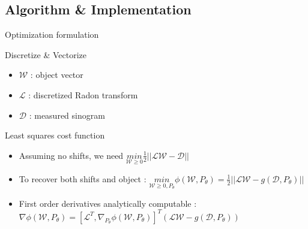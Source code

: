 \documentclass{beamer}
\begin{document}
\subsection{Algorithm \& Implementation}
\begin{frame}{Optimization formulation}
	\begin{block}{Discretize \& Vectorize}
		\begin{itemize}
			\item $\mathcal{W}$ : object vector
			\item $\mathcal{L}$ : discretized Radon transform
			\item $\mathcal{D}$ : measured sinogram
		\end{itemize}
	\end{block}
	\begin{exampleblock}{Least squares cost function}
		\begin{itemize}
			\item Assuming no shifts, we need
			$\underset{\mathcal{W} \geq 0}{\textit{min}}  \frac{1}{2}||\mathcal{L}\mathcal{W}-\mathcal{D}||$
			\item To recover both shifts and object : 
			$\underset{\mathcal{W} \geq 0, P_{\theta}}{\textit{min}}  \phi(\mathcal{W},P_{\theta}) = \frac{1}{2}||\mathcal{L}\mathcal{W} - g(\mathcal{D},P_{\theta})||$
			\item First order derivatives analytically computable :
			$ \nabla \phi(\mathcal{W},P_{\theta}) = [\mathcal{L}^{T},
			\nabla_{P_{\theta}} \phi(\mathcal{W},P_{\theta})]^{T} (\mathcal{L}\mathcal{W} - g(\mathcal{D},P_{\theta}))$
		\end{itemize}
	\end{exampleblock}\end{frame}
\end{document}
